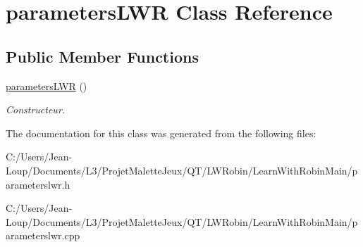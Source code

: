 \hypertarget{classparameters_l_w_r}{}\section{parameters\+L\+WR Class Reference}
\label{classparameters_l_w_r}
\subsection*{Public Member Functions}
\begin{DoxyCompactItemize}
\item 
\mbox{\label{classparameters_l_w_r_a5c42e7d346c9b25b1f956391c58f631a}} 
\hyperlink{classparameters_l_w_r_a5c42e7d346c9b25b1f956391c58f631a}{parameters\+L\+WR} ()
\begin{DoxyCompactList}\small\item\em Constructeur. \end{DoxyCompactList}\end{DoxyCompactItemize}


The documentation for this class was generated from the following files\+:\begin{DoxyCompactItemize}
\item 
C\+:/\+Users/\+Jean-\/\+Loup/\+Documents/\+L3/\+Projet\+Malette\+Jeux/\+Q\+T/\+L\+W\+Robin/\+Learn\+With\+Robin\+Main/parameterslwr.\+h\item 
C\+:/\+Users/\+Jean-\/\+Loup/\+Documents/\+L3/\+Projet\+Malette\+Jeux/\+Q\+T/\+L\+W\+Robin/\+Learn\+With\+Robin\+Main/parameterslwr.\+cpp\end{DoxyCompactItemize}
